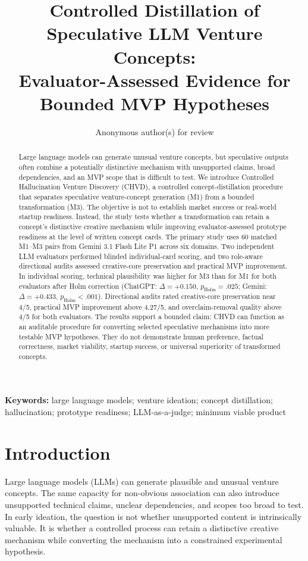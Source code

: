 \documentclass[11pt]{article}
\title{\textbf{Controlled Distillation of Speculative LLM Venture Concepts:}\\
Evaluator-Assessed Evidence for Bounded MVP Hypotheses}
\author{Anonymous author(s) for review}
\date{}
\newcommand{\chvd}{\textsc{CHVD}}
\newcommand{\mone}{M1}
\newcommand{\mthree}{M3}
\begin{document}
\maketitle

\begin{abstract}
Large language models can generate unusual venture concepts, but speculative outputs
often combine a potentially distinctive mechanism with unsupported claims, broad
dependencies, and an MVP scope that is difficult to test. We introduce Controlled
Hallucination Venture Discovery (\chvd{}), a controlled concept-distillation procedure
that separates speculative venture-concept generation (\mone{}) from a bounded
transformation (\mthree{}). The objective is not to establish market success or
real-world startup readiness. Instead, the study tests whether a transformation can
retain a concept's distinctive creative mechanism while improving evaluator-assessed
prototype readiness at the level of written concept cards. The primary study uses 60
matched \mone{}--\mthree{} pairs from Gemini 3.1 Flash Lite P1 across six domains.
Two independent LLM evaluators performed blinded individual-card scoring, and two
role-aware directional audits assessed creative-core preservation and practical MVP
improvement. In individual scoring, technical plausibility was higher for \mthree{}
than for \mone{} for both evaluators after Holm correction (ChatGPT:
$\Delta=+0.150$, $p_{\mathrm{Holm}}=.025$; Gemini: $\Delta=+0.433$,
$p_{\mathrm{Holm}}<.001$). Directional audits rated creative-core preservation near
4/5, practical MVP improvement above 4.27/5, and overclaim-removal quality above
4/5 for both evaluators. The results support a bounded claim: \chvd{} can function
as an auditable procedure for converting selected speculative mechanisms into more
testable MVP hypotheses. They do not demonstrate human preference, factual
correctness, market viability, startup success, or universal superiority of
transformed concepts.
\end{abstract}

\noindent\textbf{Keywords:} large language models; venture ideation; concept
distillation; hallucination; prototype readiness; LLM-as-a-judge; minimum viable product

\section{Introduction}
Large language models (LLMs) can generate plausible and unusual venture concepts. The
same capacity for non-obvious association can also introduce unsupported technical
claims, unclear dependencies, and scopes too broad to test. In early ideation, the
question is not whether unsupported content is intrinsically valuable. It is whether a
controlled process can retain a distinctive creative mechanism while converting the
mechanism into a constrained experimental hypothesis.
\end{document}
